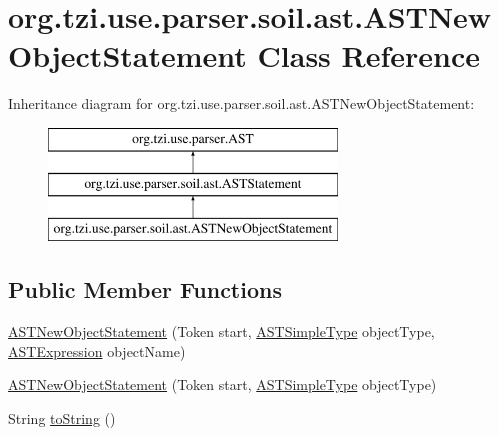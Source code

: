 \hypertarget{classorg_1_1tzi_1_1use_1_1parser_1_1soil_1_1ast_1_1_a_s_t_new_object_statement}{\section{org.\-tzi.\-use.\-parser.\-soil.\-ast.\-A\-S\-T\-New\-Object\-Statement Class Reference}
\label{classorg_1_1tzi_1_1use_1_1parser_1_1soil_1_1ast_1_1_a_s_t_new_object_statement}
}
Inheritance diagram for org.\-tzi.\-use.\-parser.\-soil.\-ast.\-A\-S\-T\-New\-Object\-Statement\-:\begin{figure}[H]
\begin{center}
\leavevmode
\includegraphics[height=3.000000cm]{classorg_1_1tzi_1_1use_1_1parser_1_1soil_1_1ast_1_1_a_s_t_new_object_statement}
\end{center}
\end{figure}
\subsection*{Public Member Functions}
\begin{DoxyCompactItemize}
\item 
\hyperlink{classorg_1_1tzi_1_1use_1_1parser_1_1soil_1_1ast_1_1_a_s_t_new_object_statement_ab780f080b479186b2627e958612478ef}{A\-S\-T\-New\-Object\-Statement} (Token start, \hyperlink{classorg_1_1tzi_1_1use_1_1parser_1_1ocl_1_1_a_s_t_simple_type}{A\-S\-T\-Simple\-Type} object\-Type, \hyperlink{classorg_1_1tzi_1_1use_1_1parser_1_1ocl_1_1_a_s_t_expression}{A\-S\-T\-Expression} object\-Name)
\item 
\hyperlink{classorg_1_1tzi_1_1use_1_1parser_1_1soil_1_1ast_1_1_a_s_t_new_object_statement_acda51d3666fab6253a02374eb721a432}{A\-S\-T\-New\-Object\-Statement} (Token start, \hyperlink{classorg_1_1tzi_1_1use_1_1parser_1_1ocl_1_1_a_s_t_simple_type}{A\-S\-T\-Simple\-Type} object\-Type)
\item 
String \hyperlink{classorg_1_1tzi_1_1use_1_1parser_1_1soil_1_1ast_1_1_a_s_t_new_object_statement_a05623237cd054badb705396df7156843}{to\-String} ()
\end{DoxyCompactItemize}
